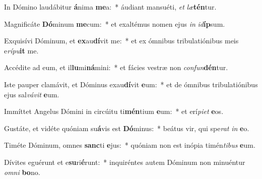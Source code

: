 \item In Dómino laudábitur \textbf{á}nima \textbf{me}a:~* áudiant mansuéti, \textit{et} \textit{læ}\textbf{tén}tur.
\item Magnificáte \textbf{Dó}minum \textbf{me}cum:~* et exaltémus nomen ejus \textit{in} \textit{id}\textbf{íp}sum.
\item Exquisívi Dóminum, et \textbf{ex}au\textbf{dí}vit me:~* et ex ómnibus tribulatiónibus meis e\textit{rí}\textit{pu}\textbf{it} me.
\item Accédite ad eum, et il\textbf{lu}mi\textbf{ná}mini:~* et fácies vestræ non \textit{con}\textit{fun}\textbf{dén}tur.
\item Iste pauper clamávit, et Dóminus exau\textbf{dí}vit \textbf{e}um:~* et de ómnibus tribulatiónibus ejus sal\textit{vá}\textit{vit} \textbf{e}um.
\item Immíttet Angelus Dómini in circúitu ti\textbf{mén}tium \textbf{e}um:~* et erí\textit{pi}\textit{et} \textbf{e}os.
\item Gustáte, et vidéte quóniam su\textbf{á}vis est \textbf{Dó}minus:~* beátus vir, qui spe\textit{rat} \textit{in} \textbf{e}o.
\item Timéte Dóminum, omnes \textbf{sanc}ti \textbf{e}jus:~* quóniam non est inópia timén\textit{ti}\textit{bus} \textbf{e}um.
\item Dívites eguérunt et e\textbf{su}ri\textbf{é}runt:~* inquiréntes autem Dóminum non minuéntur \textit{om}\textit{ni} \textbf{bo}no.
